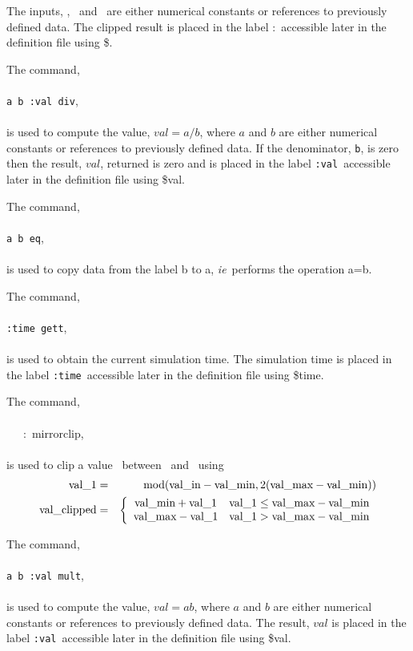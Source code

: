 \documentclass[11pt,twoside]{book}
\newcommand{\hitem}[1]{\item[{\bf #1} \hfill]}
\begin{document}
\noindent The inputs, \valin, \valmin\ and \valmax\ are either numerical
constants or references to previously defined data.  The clipped result
is placed in the label :\valclipped\ accessible later in the definition
file using \$\valclipped.

\hitem{div}
The command, \\
\\
{\tt a b :val div}, \\
\\
is used to compute the value, $val=a/b$, where $a$ and $b$ are either
numerical constants or references to previously defined data.  If the
denominator, {\tt b}, is zero then the result, $val$, returned is zero
and is placed in the label {\tt :val}\ accessible later in the definition
file using \$val.

\hitem{eq}
The command, \\
\\
{\tt a b eq}, \\
\\
is used to copy data from the label b to a, {\em ie}\ performs the operation a=b.

\hitem{gett}
The command, \\
\\
{\tt :time gett}, \\
\\
is used to obtain the current simulation time.
The simulation time is placed in the label {\tt :time}\ accessible later
in the definition file using \$time.

\hitem{mirrorclip}
The command, \\
\\
\valin\ \valmin\ \valmax\ :\valclipped\ mirrorclip, \\
\\
is used to clip a value \valin\ between \valmin\
and \valmax\ using
\begin{eqnarray}
{\tt \mbox{val\_1}}&=&\mbox{mod}( {\tt \mbox{val\_in}}-{\tt \mbox{val\_min}},2({\tt \mbox{val\_max}}-{\tt \mbox{val\_min}}) )\\
{\tt \mbox{val\_clipped}}&=&\left\{
\begin{array}{cc}
  {\tt \mbox{val\_min}}+{\tt \mbox{val\_1}} & {\tt \mbox{val\_1}}\le {\tt \mbox{val\_max}}-{\tt \mbox{val\_min}} \\
  {\tt \mbox{val\_max}}-{\tt \mbox{val\_1}} & {\tt \mbox{val\_1}}> {\tt \mbox{val\_max}}-{\tt \mbox{val\_min}}
\end{array}
\right.
\end{eqnarray}

\hitem{mult}
The command, \\
\\
{\tt a b :val mult}, \\
\\
is used to compute the value, $val=ab$, where $a$ and $b$ are either
numerical constants or references to previously defined data.
The result, $val$ is placed in the label {\tt :val}\ accessible
later in the definition file using \$val.
\end{document}

